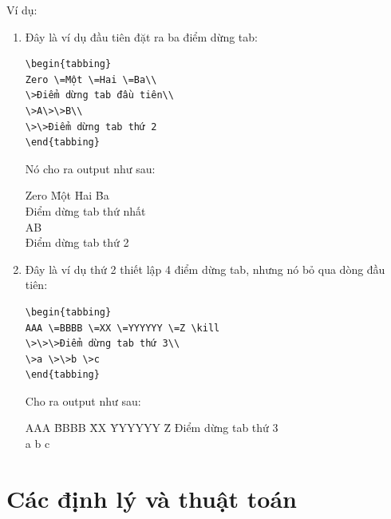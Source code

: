 \documentclass[a4paper]{report}
\begin{document}
Ví dụ:
\begin{enumerate}
\item Đây là ví dụ đầu tiên đặt ra ba điểm dừng tab:
\begin{code}
\begin{verbatim}
\begin{tabbing}
Zero \=Một \=Hai \=Ba\\
\>Điểm dừng tab đầu tiên\\
\>A\>\>B\\
\>\>Điểm dừng tab thứ 2
\end{tabbing}
\end{verbatim}
\end{code}%
Nó cho ra output như sau:
\begin{result}
\begin{tabbing}
Zero \=Một \=Hai \=Ba\\
\>Điểm dừng tab thứ nhất\\
\>A\>\>B\\
\>\>Điểm dừng tab thứ 2
\end{tabbing}
\end{result}

\item Đây là ví dụ thứ 2 thiết lập 4 điểm dừng tab, nhưng nó bỏ qua dòng đầu tiên:
\begin{code}
\begin{verbatim}
\begin{tabbing}
AAA \=BBBB \=XX \=YYYYYY \=Z \kill
\>\>\>Điểm dừng tab thứ 3\\
\>a \>\>b \>c
\end{tabbing}
\end{verbatim}
\end{code}%
Cho ra output như sau:
\begin{result}
\begin{tabbing}
AAA \=BBBB \=XX \=YYYYYY \=Z \kill
\>\>\>Điểm dừng tab thứ 3\\
\>a \>\>b \>c
\end{tabbing}
\end{result}

\end{enumerate}


\section{Các định lý và thuật toán }
\end{document}
